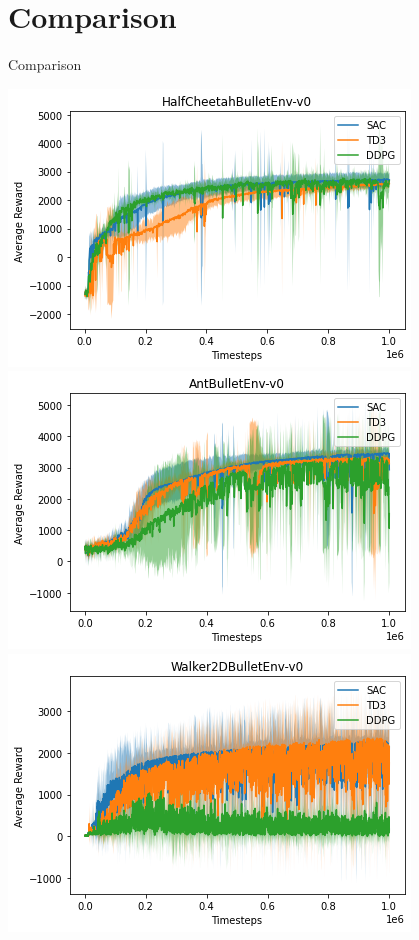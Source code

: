 \documentclass{beamer}
\begin{document}

\section{Comparison}

\begin{frame}{Comparison}
\begin{center}
 {
    \includegraphics[scale=0.7]{halfcheetah.png}
}
 {
    \includegraphics[scale=0.7]{antbullet.png}
}
 {
    \includegraphics[scale=0.7]{walker.png}
}
\end{center}
\end{frame}
\end{document}
